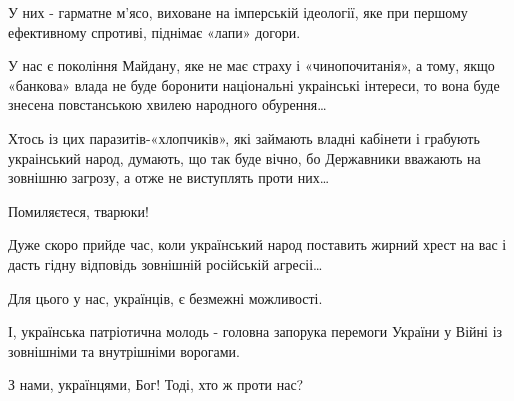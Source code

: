 У них - гарматне м’ясо, виховане на імперській ідеології, яке при першому
ефективному спротиві, піднімає «лапи» догори.

У нас є покоління Майдану, яке не має страху і «чинопочитанія», а тому, якщо
«банкова» влада не буде боронити національні украінські інтереси, то вона буде
знесена повстанською хвилею народного обурення…

Хтось із цих паразитів-«хлопчиків», які займають владні кабінети і грабують
украінський народ, думають, що так буде вічно, бо Державники вважають на
зовнішню загрозу, а отже не виступлять проти них…

Помиляєтеся, тварюки!

Дуже скоро прийде час, коли український народ поставить жирний хрест на вас і
дасть гідну відповідь зовнішній російській агресіі… 

Для цього у нас, українців, є безмежні можливості. 

І, українська патріотична молодь - головна запорука перемоги України у Війні із
зовнішніми та внутрішніми ворогами.

З нами, українцями, Бог! Тоді, хто ж проти нас?
